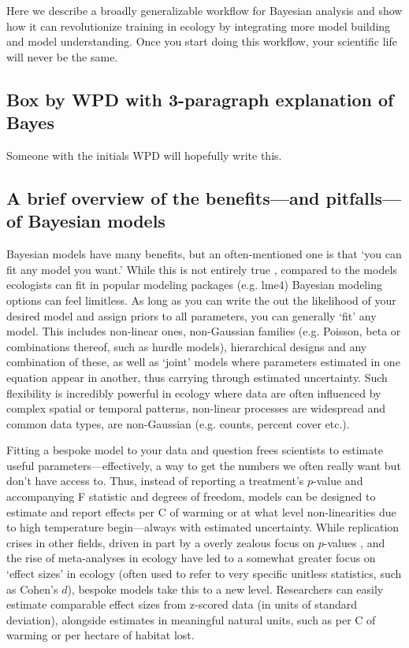 \documentclass[11pt]{article}
\begin{document}
Here we describe a broadly generalizable workflow for Bayesian analysis and show how it can revolutionize training in ecology by integrating more model building and model understanding. Once you start doing this workflow, your scientific life will never be the same. 

\subsection{Box by WPD with 3-paragraph explanation of Bayes}

Someone with the initials WPD will hopefully write this. 

\subsection{A brief overview of the benefits---and pitfalls---of Bayesian models} 

Bayesian models have many benefits, but an often-mentioned one is that `you can fit any model you want.' While this is not entirely true \citep{BDA,reid2019}, compared to the models ecologists can fit in popular modeling packages (e.g. \textsf{lme4}) Bayesian modeling options can feel limitless. As long as you can write the out the likelihood of your desired model and assign priors to all parameters, you can generally `fit' any model. This includes non-linear ones, non-Gaussian families (e.g. Poisson, beta or combinations thereof, such as hurdle models), hierarchical designs and any combination of these, as well as `joint' models where parameters estimated in one equation appear in another, thus carrying through estimated uncertainty. Such flexibility is incredibly powerful in ecology where data are often influenced by complex spatial or temporal patterns, non-linear processes are widespread and common data types, are non-Gaussian (e.g. counts, percent cover etc.). 

Fitting a bespoke model to your data and question frees scientists to estimate useful parameters---effectively, a way to get the numbers we often really want but don't have access to. Thus, instead of reporting a treatment's $p$-value and accompanying F statistic and degrees of freedom, models can be designed to estimate and report effects per \degree C of warming or at what level non-linearities due to high temperature begin---always with estimated uncertainty. While replication crises in other fields, driven in part by a overly zealous focus on $p$-values \citep{halsey2015,loken2017}, and the rise of meta-analyses in ecology \citep{Hampton2013} have led to a somewhat greater focus on `effect sizes' in ecology (often used to refer to very specific unitless statistics, such as Cohen's $d$), bespoke models take this to a new level. Researchers can easily estimate comparable effect sizes from z-scored data (in units of standard deviation), alongside estimates in meaningful natural units, such as per \degree C of warming or per hectare of habitat lost. 
\end{document}
